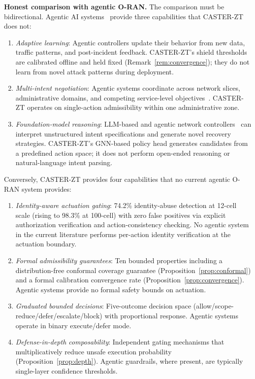 \documentclass[10pt,journal,compsoc]{IEEEtran}
\begin{document}
\noindent\textbf{Honest comparison with agentic O-RAN.}
The comparison must be bidirectional.
Agentic AI systems~\cite{toward_autonomous_oran_2026,demirel2026agentic,lee2024llmran} provide three capabilities that CASTER-ZT does not:
\begin{enumerate}
    \item \emph{Adaptive learning}: Agentic controllers update their behavior from new data, traffic patterns, and post-incident feedback.  CASTER-ZT's shield thresholds are calibrated offline and held fixed (Remark~\ref{rem:convergence}); they do not learn from novel attack patterns during deployment.
    \item \emph{Multi-intent negotiation}: Agentic systems coordinate across network slices, administrative domains, and competing service-level objectives~\cite{demirel2026agentic}.  CASTER-ZT operates on single-action admissibility within one administrative zone.
    \item \emph{Foundation-model reasoning}: LLM-based and agentic network controllers~\cite{toward_autonomous_oran_2026,demirel2026agentic,lee2024llmran} can interpret unstructured intent specifications and generate novel recovery strategies.  CASTER-ZT's GNN-based policy head generates candidates from a predefined action space; it does not perform open-ended reasoning or natural-language intent parsing.
\end{enumerate}
Conversely, CASTER-ZT provides four capabilities that no current agentic O-RAN system provides:
\begin{enumerate}
    \item \emph{Identity-aware actuation gating}: 74.2\% identity-abuse detection at 12-cell scale (rising to 98.3\% at 100-cell) with zero false positives via explicit authorization verification and action-consistency checking.  No agentic system in the current literature performs per-action identity verification at the actuation boundary.
    \item \emph{Formal admissibility guarantees}: Ten bounded properties including a distribution-free conformal coverage guarantee (Proposition~\ref{prop:conformal}) and a formal calibration convergence rate (Proposition~\ref{prop:convergence}).  Agentic systems provide no formal safety bounds on actuation.
    \item \emph{Graduated bounded decisions}: Five-outcome decision space (allow/scope-reduce/defer/escalate/block) with proportional response.  Agentic systems operate in binary execute/defer mode.
    \item \emph{Defense-in-depth composability}: Independent gating mechanisms that multiplicatively reduce unsafe execution probability (Proposition~\ref{prop:depth}).  Agentic guardrails, where present, are typically single-layer confidence thresholds.
\end{enumerate}
\end{document}
